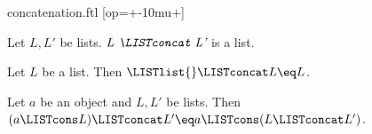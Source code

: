 \documentclass{naproche-library}
\begin{document}
\begin{smodule}[title=Concatenation]{concatenation.ftl}
[op=+\mkern-10mu+]{\mathbin{\highlight{+\mkern-10mu+}}}

\begin{signature}[forthel,id=ConcatSig]
  Let $L, L'$ be lists.
  $\emph{L \LISTconcat L'}$ is a list.
\end{signature}

\begin{axiom}[forthel,id=LeftConcatNilAx]
  Let $L$ be a list.
  Then $\LISTlist{} \LISTconcat L \eq L$.
\end{axiom}

\begin{axiom}[forthel,id=LeftConcatConsAx]
  Let $a$ be an object and $L, L'$ be lists.
  Then $(a \LISTcons L) \LISTconcat L' \eq a \LISTcons (L \LISTconcat L')$.
\end{axiom}
\end{smodule}
\end{document}
